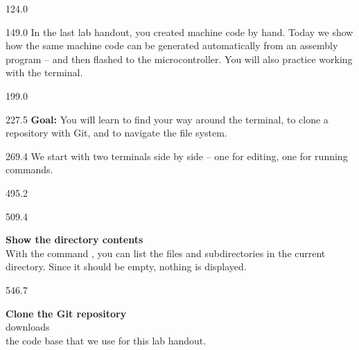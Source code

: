 \documentclass{aslab}
\begin{document}
\maketitleblock

\begin{region}{124.0}
\end{region}

\begin{region}{149.0}
In the last lab handout, you created machine code by hand. Today we show
how the same machine code can be generated automatically from an assembly
program -- and then flashed to the microcontroller. You will also practice
working with the terminal.
\end{region}

\begin{region}{199.0}
\end{region}

\begin{region}[pitch=14.3]{227.5}
\textbf{Goal:} You will learn to find your way around the terminal, to
clone a repository with Git, and to navigate the file system.
\end{region}

\begin{region}[pitch=13.2]{269.4}
We start with two terminals side by side -- one for editing, one for
running commands.
\end{region}


\begin{region}{495.2}
\end{region}

\begin{region}[pitch=12.2]{509.4}
\begin{alphatasks}
\item \textbf{Show the directory contents}\\
  With the command , you can list the files and subdirectories in
  the current directory. Since it should be empty, nothing is displayed.
\end{alphatasks}
\end{region}

\begin{region}[pitch=12.2]{546.7}
\begin{alphatasks}[start=2]
\item \textbf{Clone the Git repository}\\
  downloads\\ the code base that we use for this lab handout.
\end{alphatasks}
\end{region}
\end{document}
